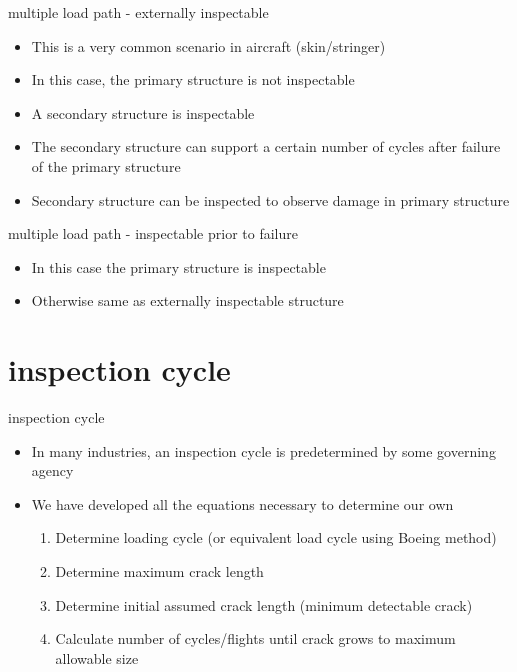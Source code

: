 \documentclass[
  letterpaper,
  ignorenonframetext,
  aspectratio=43,
  handout,
  12pt]{beamer}
\providecommand{\tightlist}{%
  \setlength{\itemsep}{0pt}\setlength{\parskip}{0pt}}
\providecommand{\tightlist}{%
\setlength{\itemsep}{0pt}\setlength{\parskip}{0pt}}
\begin{document}
\begin{frame}{multiple load path - externally inspectable}
\protect\hypertarget{multiple-load-path---externally-inspectable}{}
\begin{itemize}
\tightlist
\item
  This is a very common scenario in aircraft (skin/stringer)
\item
  In this case, the primary structure is not inspectable
\item
  A secondary structure is inspectable
\item
  The secondary structure can support a certain number of cycles after
  failure of the primary structure
\item
  Secondary structure can be inspected to observe damage in primary
  structure
\end{itemize}
\end{frame}

\begin{frame}{multiple load path - inspectable prior to failure}
\protect\hypertarget{multiple-load-path---inspectable-prior-to-failure}{}
\begin{itemize}
\tightlist
\item
  In this case the primary structure is inspectable
\item
  Otherwise same as externally inspectable structure
\end{itemize}
\end{frame}

\hypertarget{inspection-cycle}{%
\section{inspection cycle}\label{inspection-cycle}}

\begin{frame}{inspection cycle}
\protect\hypertarget{inspection-cycle-1}{}
\begin{itemize}
\tightlist
\item
  In many industries, an inspection cycle is predetermined by some
  governing agency
\item
  We have developed all the equations necessary to determine our own

  \begin{enumerate}
  \tightlist
  \item
    Determine loading cycle (or equivalent load cycle using Boeing
    method)
  \item
    Determine maximum crack length
  \item
    Determine initial assumed crack length (minimum detectable crack)
  \item
    Calculate number of cycles/flights until crack grows to maximum
    allowable size
  \end{enumerate}
\end{itemize}
\end{frame}
\end{document}
